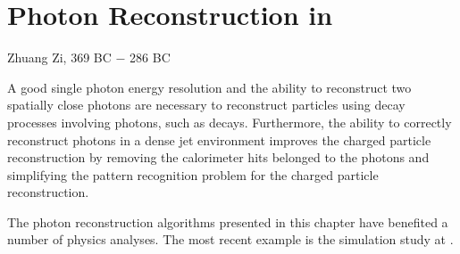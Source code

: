 \chapter{Photon Reconstruction in \pandora}
\label{chap:Photon}

%
{Zhuang Zi, 369 BC $-$ 286 BC}

A good single photon energy resolution and the ability to reconstruct two spatially close photons are necessary to reconstruct particles using decay processes involving photons, such as \HepProcess{\Ppizero\to\Pgamma\Pgamma} decays. Furthermore, the ability to correctly reconstruct photons in a dense jet environment improves the charged particle reconstruction by removing the calorimeter hits belonged to the photons and simplifying the  pattern recognition problem for the charged particle reconstruction.






The photon reconstruction algorithms presented in this chapter have benefited a number of physics analyses. The most recent example  is the  \HepProcess{\PHiggs \to \Pgamma \Pgamma} simulation study at  \CLIC \cite{Kacarevic:higgsToGammaGamma}.

